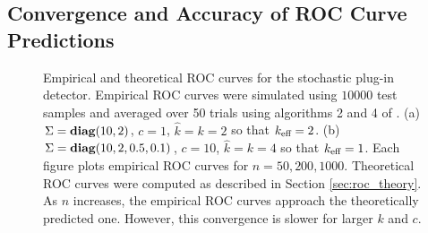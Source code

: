 \subsection{Convergence and Accuracy of ROC Curve Predictions}
\begin{figure}[t]
\centering
{}
\vspace{-0.1in}
\caption{Empirical and theoretical ROC curves for the stochastic plug-in detector. Empirical ROC curves were simulated using $10000$ test samples and averaged over 50 trials using algorithms 2 and 4 of \cite{fawcett2006introduction}. (a) $\Sigma=\mathop{\bf diag}(10,2)$, $c=1$, $\widehat{k}=k=2$ so that $k_\text{eff}=2$. (b) $\Sigma=\mathop{\bf diag}(10,2,0.5,0.1)$, $c=10$, $\widehat{k}=k=4$ so that $k_\text{eff}=1$. Each figure plots empirical ROC curves for $n=50,200,1000$. Theoretical ROC curves were computed as described in Section \ref{sec:roc_theory}. As $n$ increases, the empirical ROC curves approach the theoretically predicted one. However, this convergence is slower for larger $k$ and $c$.}

\end{figure}
